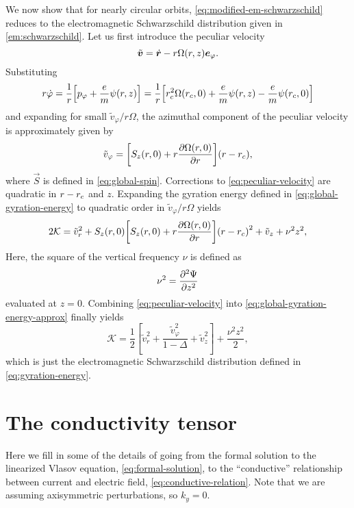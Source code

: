 \documentclass[aps,pre,notitlepage,amsmath,amssymb,amsfonts,nobibnotes,nofootinbib]{revtex4-1}
\begin{document}
We now show that for nearly circular orbits,
\cref{eq:modified-em-schwarzschild} reduces to the electromagnetic
Schwarzschild distribution given in \cref{em:schwarzschild}. Let us first
introduce the peculiar velocity
\begin{equation}
  \tilde{\bm{v}} = \dot{\bm{r}} - r\Omega(r,z)\bm{e}_\varphi.
\end{equation}
Substituting
\begin{equation}
  r\dot{\varphi} = \frac{1}{r}\left[p_\varphi + \cm\psi(r,z)\right] =
  \frac{1}{r}\left[\rc^2\Omega(\rc,0) + \cm\psi(r,z) - \cm\psi(\rc,0)\right]
\end{equation}
and expanding for small $\tilde{v}_\varphi/r\Omega$, the azimuthal component
of the peculiar velocity is approximately given by
\begin{equation}
  \label{eq:peculiar-velocity}
  \tilde{v}_\varphi =
  \left[S_z(r,0) + r\pder{\Omega(r,0)}{r}\right](r - \rc),
\end{equation}
where $\vec{S}$ is defined in \cref{eq:global-spin}. Corrections to
\cref{eq:peculiar-velocity} are quadratic in $r-r_c$ and $z$. Expanding the
gyration energy defined in \cref{eq:global-gyration-energy} to quadratic order
in $\tilde{v}_\varphi/r\Omega$ yields
\begin{equation}
  \label{eq:global-gyration-energy-approx}
  2\mathcal{K} = \tilde{v}_r^2
  + S_z(r,0)\left[S_z(r,0) + r\pder{\Omega(r,0)}{r}\right]
  {(r - \rc)}^2 + \tilde{v}_z + \nu^2 z^2,
\end{equation}
Here, the square of the vertical frequency $\nu$ is defined as
\begin{equation}
  \nu^2 = \frac{\partial^2\Psi}{\partial z^2}
\end{equation}
evaluated at $z=0$. Combining \cref{eq:peculiar-velocity} into
\cref{eq:global-gyration-energy-approx} finally yields
\begin{equation}
  \mathcal{K} = \frac{1}{2}\left[
    \tilde{v}_r^2 + \frac{\tilde{v}_\varphi^2}{1 - \Delta} + \tilde{v}_z^2
  \right] + \frac{\nu^2 z^2}{2},
\end{equation}
which is just the electromagnetic Schwarzschild distribution defined in
\cref{eq:gyration-energy}.

\section{The conductivity tensor}
\label{app:conductivity-tensor}

Here we fill in some of the details of going from the formal solution to the
linearized Vlasov equation, \cref{eq:formal-solution}, to the ``conductive''
relationship between current and electric field,
\cref{eq:conductive-relation}. Note that we are assuming axisymmetric
perturbations, so $k_y=0$.
\end{document}
